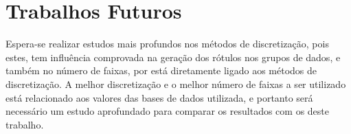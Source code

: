 




\section{Trabalhos Futuros}\label{cap:fut}



Espera-se realizar estudos mais profundos nos métodos de discretização, pois estes, tem influência comprovada na geração dos rótulos nos grupos de dados, e também no número de faixas, por está diretamente ligado aos métodos de discretização. A melhor discretização e o melhor número de faixas a ser utilizado está relacionado aos valores das bases de dados utilizada, e portanto  será necessário um estudo aprofundado para comparar os  resultados com os deste trabalho.

